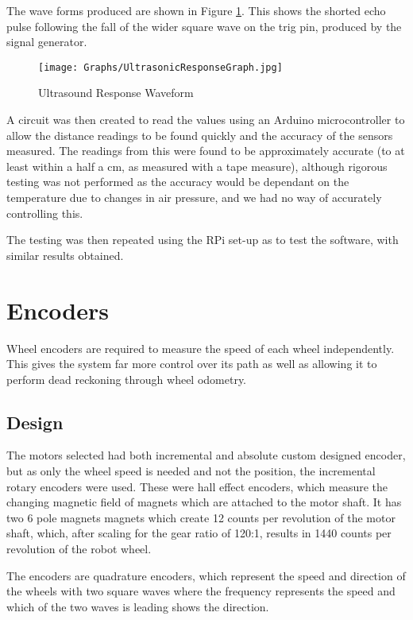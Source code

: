 The wave forms produced are shown in Figure \ref{UltrasoundWaveform}. This shows the shorted echo pulse following the fall of the wider square wave on the trig pin, produced by the signal generator. 

\begin{figure}[!ht]
	\centering
	\texttt{[image: Graphs/UltrasonicResponseGraph.jpg]}
	\caption{Ultrasound Response Waveform}\label{UltrasoundWaveform}

\end{figure}

A circuit was then created to read the values using an Arduino microcontroller to allow the distance readings to be found quickly and the accuracy of the sensors measured. The readings from this were found to be approximately accurate (to at least within a half a cm, as measured with a tape measure), although rigorous testing was not performed as the accuracy would be dependant on the temperature due to changes in air pressure, and we had no way of accurately controlling this. 

The testing was then repeated using the RPi set-up as to test the software, with similar results obtained.

\section{Encoders}\label{elec/encoder}
Wheel encoders are required to measure the speed of each wheel independently. This gives the system far more control over its path as well as allowing it to perform dead reckoning through wheel odometry. 
\subsection{Design}\label{elec/encoder/design}
 The motors selected had both incremental and absolute custom designed encoder, but as only the wheel speed is needed and not the position, the incremental rotary encoders were used. These were hall effect encoders, which measure the changing magnetic field of magnets which are attached to the motor shaft. It has two 6 pole magnets magnets which create 12 counts per revolution of the motor shaft, which, after scaling for the gear ratio of 120:1, results in 1440 counts per revolution of the robot wheel. 
 
The encoders are quadrature encoders, which represent the speed and direction of the wheels with two square waves where the frequency represents the speed and which of the two waves is leading shows the direction.

